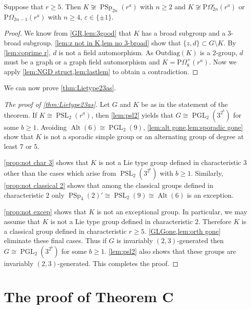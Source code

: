 \documentclass[12pt,a4paper]{amsart}
\DeclareMathOperator{\PGL}{PGL}
\DeclareMathOperator{\PSL}{PSL}
\DeclareMathOperator{\PSp}{PSp}
\DeclareMathOperator{\Alt}{Alt}
\renewcommand{\epsilon}{\varepsilon}
\newcommand{\eps}{\epsilon}
\begin{document}
\begin{lemma}\label{lem:orth gone} Suppose that $r \ge 5$. Then   $K\not \cong \PSp_{2n}(r^a)$ with $n \ge 2$ and
 $K \not \cong \mathrm P \Omega_{2n}^\eps(r^a)$ or $\mathrm P\Omega_{2n-1}(r^a)$ with $n \ge 4$, $\eps\in \{\pm 1\}$.
\end{lemma}

\begin{proof} We know from \cref{GR,lem:3good} that $K$ has a broad subgroup and a $3$-broad subgroup. \cref{lem:z not in K,lem no 3-broad} show that $\{z,d\}\subset G\setminus K$. By \cref{lem:coprime r}, $d$ is not a field automorphism. As $\mathrm{Outdiag}(K)$ is a $2$-group, $d$ must be a graph or a graph field automorphism and $K=\mathrm P\Omega_8^+(r^a)$. Now we apply \cref{lem:NGD struct,lem:lastlem} to obtain a contradiction.
\end{proof}



We can now prove  \cref{thm:Lietype23as}.
\begin{proof}[The proof of \cref{thm:Lietype23as}] Let $G$ and $K$ be as in the statement of the theorem.
 If $K \cong \PSL_2(r^a)$, then \cref{lem:psl2} yields that $G\cong \PGL_2(3^{2^b})$ for some $b\ge 1$. Avoiding $\Alt(6) \cong \PGL_2(9)$, \cref{lem:alt gone,lem:sporadic gone} show that $K$
  is not a sporadic simple group or an alternating group of degree at least $7$ or $5$.

  \cref{prop:not char 3} shows that $K$ is not a Lie type group defined in characteristic $3$ other than the cases which arise from $\PSL_2(3^{2^b})$ with $b \ge 1$.  Similarly, \cref{prop:not classical 2} shows that among the classical groups defined in characteristic $2$ only  $\PSp_4(2)' \cong \PSL_2(9)\cong \Alt(6)$ is an exception.

\cref{prop:not excep} shows that $K$ is not an exceptional group. In particular, we may assume that   $K$ is not a Lie type group defined in characteristic $2$.
Therefore $K$ is a classical group defined in characteristic $r \ge 5$. \cref{GLGone,lem:orth gone}  eliminate these final cases. Thus if $G$ is invariably $(2,3)$-generated then $G \cong \PGL_2(3^{2^b})$ for some $b \ge 1$.  \cref{lem:psl2} also shows that these groups are invariably $(2,3)$-generated. This completes the proof.
\end{proof}



\section{The proof of Theorem C}\label{sec:8}
\end{document}
